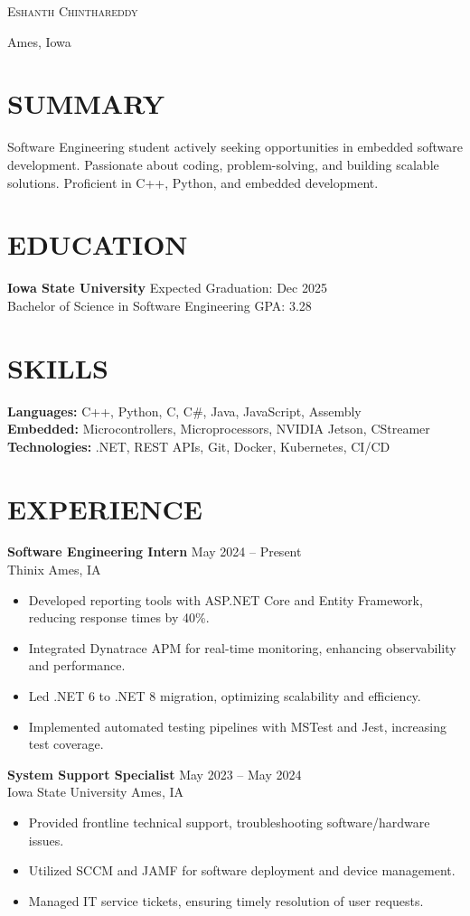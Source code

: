 \documentclass[letterpaper,11pt]{article}
\newcommand{\name}[1]{\centerline{\Huge \scshape #1}\vspace{1.25ex}}
\newcommand{\address}[1]{\centerline{#1}\vspace{-7pt}}
\begin{document}
\name{Eshanth Chinthareddy}
\address{Ames, Iowa}
\begin{resume}

\section{SUMMARY}
Software Engineering student actively seeking opportunities in embedded software development. Passionate about coding, problem-solving, and building scalable solutions. Proficient in C++, Python, and embedded development.

\section{EDUCATION}
\textbf{Iowa State University} \hfill Expected Graduation: Dec 2025 \\
Bachelor of Science in Software Engineering \hfill GPA: 3.28

\section{SKILLS}
\textbf{Languages:} C++, Python, C, C\#, Java, JavaScript, Assembly \\
\textbf{Embedded:} Microcontrollers, Microprocessors, NVIDIA Jetson, CStreamer \\
\textbf{Technologies:} .NET, REST APIs, Git, Docker, Kubernetes, CI/CD

\section{EXPERIENCE}
\textbf{Software Engineering Intern} \hfill May 2024 – Present \\
Thinix \hfill Ames, IA
\begin{itemize}
  \item Developed reporting tools with ASP.NET Core and Entity Framework, reducing response times by 40\%.
  \item Integrated Dynatrace APM for real-time monitoring, enhancing observability and performance.
  \item Led .NET 6 to .NET 8 migration, optimizing scalability and efficiency.
  \item Implemented automated testing pipelines with MSTest and Jest, increasing test coverage.
\end{itemize}

\textbf{System Support Specialist} \hfill May 2023 – May 2024 \\
Iowa State University \hfill Ames, IA
\begin{itemize}
  \item Provided frontline technical support, troubleshooting software/hardware issues.
  \item Utilized SCCM and JAMF for software deployment and device management.
  \item Managed IT service tickets, ensuring timely resolution of user requests.
\end{itemize}


\end{resume}
\end{document}
